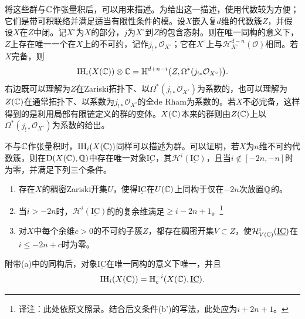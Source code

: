 将这些群与$\mathbb C$作张量积后，可以用来描述。为给出这一描述，使用代数较为方便；它们是带可积联络并满足适当有限性条件的模。设$X$嵌入复$d$维的代数簇$Z$，并假设$X$在$Z$中闭。记$X^\circ$为$X$的部分，$j$为$X^\circ$到$Z$的包含态射。则在唯一同构的意义下，$Z$上存在唯一一个在$X$上的不可约，记作$j_{!*}\mathcal O_{X^\circ}$；它在$X^\circ$上与$\mathcal H^{d-n}_{X^\circ}(\mathcal O)$相同。若$X$完备，则
\[
\mathrm{IH}_i(X(\mathbb C))\otimes\mathbb C
=\mathbb H^{d+n-i}\bigl(Z,\Omega^*(j_{!*}\mathcal O_{X^\circ})\bigr).
\]
右边既可以理解为$Z$在Zariski拓扑下、以$\Omega^*(j_{!*}\mathcal O_{X^\circ})$为系数的，也可以理解为$Z(\mathbb C)$在通常拓扑下、以系数为$j_{!*}\mathcal O_{X^\circ}$的全de Rham为系数的。若$X$不必完备，这样得到的是利用局部有限链定义的群的变体。$X(\mathbb C)$本来的群则由$Z(\mathbb C)$上以$\Omega^*(j_{!*}\mathcal O_{X^\circ})$为系数的给出。

不与$\mathbb C$作张量积时，$\mathrm{IH}_i(X(\mathbb C))$同样可以描述为群。可以证明，若$X$为$n$维不可约代数簇，则在$\mathrm{D}(X(\mathbb C),\mathbb Q)$中存在唯一对象$\underline{\mathrm{IC}}$，其$\mathcal H^i(\underline{\mathrm{IC}})$，且当$i\notin[-2n,-n]$时为零，并满足下列三个条件。
\begin{enumerate}[label=(\alph*)]
\item 存在$X$的稠密Zariski开集$U$，使得$\underline{\mathrm{IC}}$在$U(\mathbb C)$上同构于仅在$-2n$次放置$\mathbb Q$的。
\item 当$i>-2n$时，$\mathcal H^i(\underline{\mathrm{IC}})$的的复余维满足$\geq i-2n+1$。\footnote{译注：此处依原文照录。结合后文条件(b')的写法，此处应为$i+2n+1$。}
\item 对$X$中每个余维$c>0$的不可约子簇$Z$，都存在稠密开集$V\subset Z$，使$\mathcal H^i_{V(\mathbb C)}(\underline{\mathrm{IC}})$在$i\leq-2n+c$时为零。
\end{enumerate}
附带(a)中的同构后，对象$\underline{\mathrm{IC}}$在唯一同构的意义下唯一，并且
\[
\mathrm{IH}_i(X(\mathbb C))=\mathbb H_c^{-i}(X(\mathbb C),\underline{\mathrm{IC}}).
\]

